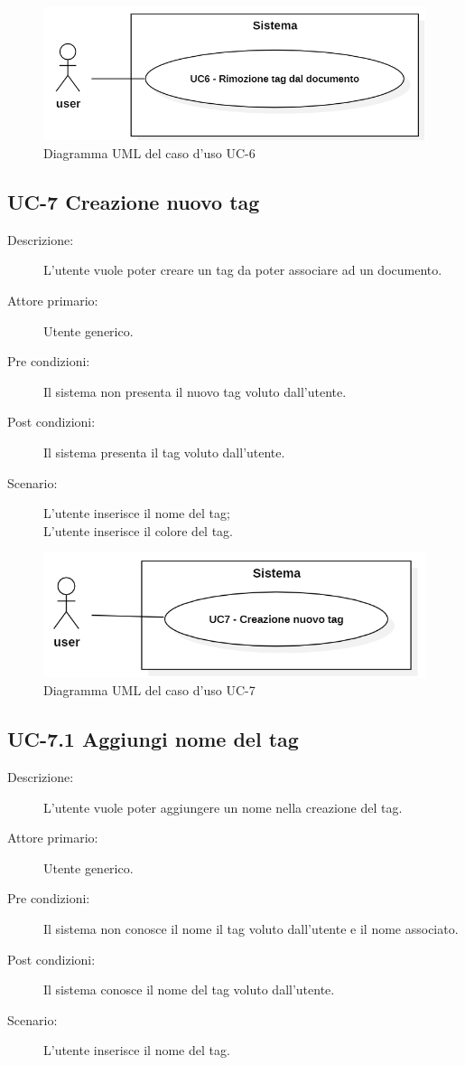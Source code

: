 \begin{figure}[H]
    \centering
    \includegraphics[width=0.8\linewidth]{UC6.PNG}
    \caption{Diagramma UML del caso d'uso UC-6}
    \label{fig:UC6}
\end{figure}

\subsection{UC-7 Creazione nuovo tag}
\begin{description}
    \item[Descrizione:] L’utente vuole poter creare un tag da poter associare ad un documento.
    \item[Attore primario:] Utente generico.
    \item[Pre condizioni:] Il sistema non presenta il nuovo tag voluto dall’utente.
    \item[Post condizioni:] Il sistema presenta il tag voluto dall’utente.
    \item[Scenario:] L’utente inserisce il nome del tag;\\L’utente inserisce il colore del tag.
\end{description}

\begin{figure}[H]
    \centering
    \includegraphics[width=0.8\linewidth]{UC7.PNG}
    \caption{Diagramma UML del caso d'uso UC-7}
    \label{fig:UC7}
\end{figure}

\subsection{UC-7.1 Aggiungi nome del tag}
\begin{description}
    \item[Descrizione:] L’utente vuole poter aggiungere un nome nella creazione del tag.
    \item[Attore primario:] Utente generico.
    \item[Pre condizioni:] Il sistema non conosce il nome  il tag voluto dall’utente e il nome associato.
    \item[Post condizioni:] Il sistema conosce il nome del tag voluto dall’utente.
    \item[Scenario:] L’utente inserisce il nome del tag.
\end{description}

